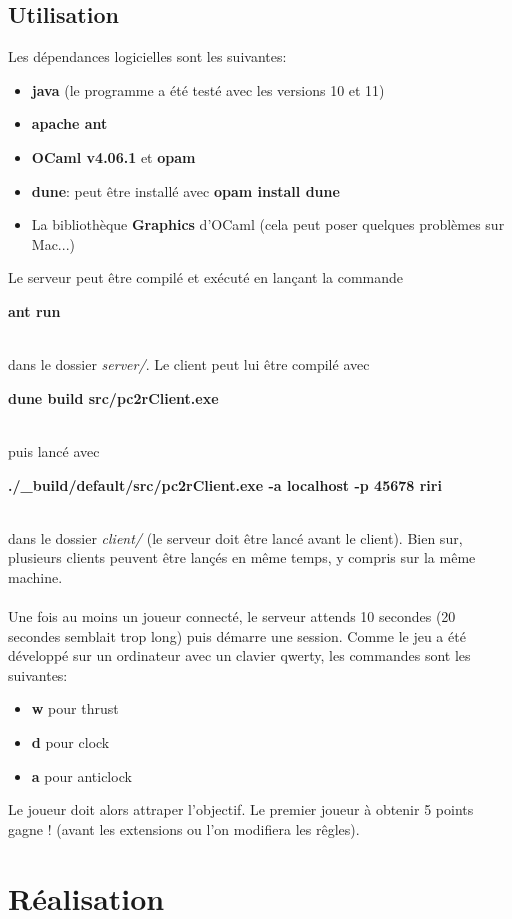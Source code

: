 \documentclass{article}
\begin{document}
\subsection{Utilisation}
Les dépendances logicielles sont les suivantes:
\begin{itemize}
  \item \textbf{java} (le programme a été testé avec les versions 10 et 11)
  \item \textbf{apache ant}
  \item \textbf{OCaml v4.06.1} et \textbf{opam}
  \item \textbf{dune}: peut être installé avec \textbf{opam install dune}
  \item La bibliothèque \textbf{Graphics} d'OCaml (cela peut poser quelques problèmes sur Mac...)
\end{itemize}
Le serveur peut être compilé et exécuté en lançant la commande\\
\centerline{\textbf{ant run}}\\
dans le dossier \textit{server/}. Le client peut lui être compilé avec\\
\centerline{\textbf{dune build src/pc2rClient.exe}}\\
puis lancé avec\\
\centerline{\textbf{./\_build/default/src/pc2rClient.exe -a localhost -p 45678 riri}}\\
dans le dossier \textit{client/} (le serveur doit être lancé avant le client). Bien sur, plusieurs clients peuvent être lançés en même temps, y compris sur la même machine.\\\\
Une fois au moins un joueur connecté, le serveur attends 10 secondes (20 secondes semblait trop long) puis démarre une session. Comme le jeu a été développé sur un ordinateur avec un clavier qwerty, les commandes sont les suivantes:
\begin{itemize}
\item \textbf{w} pour thrust
\item \textbf{d} pour clock
\item \textbf{a} pour anticlock
\end{itemize}
Le joueur doit alors attraper l'objectif. Le premier joueur à obtenir 5 points gagne ! (avant les extensions ou l'on modifiera les rêgles).

\section{Réalisation}
\end{document}
